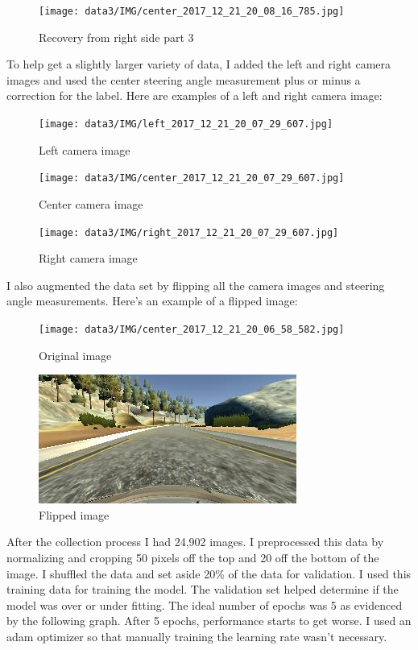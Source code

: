 \documentclass[12pt]{article}
\begin{document}
\begin{figure}[h]
\centering
\texttt{[image: data3/IMG/center\_2017\_12\_21\_20\_08\_16\_785.jpg]}
\caption{Recovery from right side part 3}
\end{figure}

To help get a slightly larger variety of data, I added the left and right camera images and used the center steering angle measurement plus or minus a correction for the label. Here are examples of a left and right camera image:

\begin{figure}[h]
\centering
\texttt{[image: data3/IMG/left\_2017\_12\_21\_20\_07\_29\_607.jpg]}
\caption{Left camera image}
\end{figure}

\begin{figure}[h]
\centering
\texttt{[image: data3/IMG/center\_2017\_12\_21\_20\_07\_29\_607.jpg]}
\caption{Center camera image}
\end{figure}

\begin{figure}[h]
\centering
\texttt{[image: data3/IMG/right\_2017\_12\_21\_20\_07\_29\_607.jpg]}
\caption{Right camera image}
\end{figure}

I also augmented the data set by flipping all the camera images and steering angle measurements. Here's an example of a flipped image:
\begin{figure}[h]
\centering
\texttt{[image: data3/IMG/center\_2017\_12\_21\_20\_06\_58\_582.jpg]}
\caption{Original image}
\end{figure}

\begin{figure}[h]
\centering
\includegraphics[scale = 1]{flipped_center_2017_12_21_20_06_58_582.jpg}
\caption{Flipped image}
\end{figure}

After the collection process I had 24,902 images. I preprocessed this data by normalizing and cropping 50 pixels off the top and 20 off the bottom of the image. I shuffled the data and set aside 20\% of the data for validation. I used this training data for training the model. The validation set helped determine if the model was over or under fitting. The ideal number of epochs was 5 as evidenced by the following graph. After 5 epochs, performance starts to get worse. I used an adam optimizer so that manually training the learning rate wasn't necessary.
\end{document}
